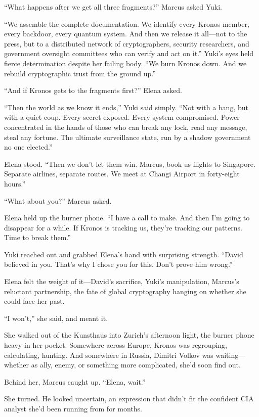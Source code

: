 \documentclass[12pt,letterpaper]{book}
\begin{document}
``What happens after we get all three fragments?'' Marcus asked Yuki.

``We assemble the complete documentation. We identify every Kronos member, every backdoor, every quantum system. And then we release it all---not to the press, but to a distributed network of cryptographers, security researchers, and government oversight committees who can verify and act on it.'' Yuki's eyes held fierce determination despite her failing body. ``We burn Kronos down. And we rebuild cryptographic trust from the ground up.''

``And if Kronos gets to the fragments first?'' Elena asked.

``Then the world as we know it ends,'' Yuki said simply. ``Not with a bang, but with a quiet coup. Every secret exposed. Every system compromised. Power concentrated in the hands of those who can break any lock, read any message, steal any fortune. The ultimate surveillance state, run by a shadow government no one elected.''

Elena stood. ``Then we don't let them win. Marcus, book us flights to Singapore. Separate airlines, separate routes. We meet at Changi Airport in forty-eight hours.''

``What about you?'' Marcus asked.

Elena held up the burner phone. ``I have a call to make. And then I'm going to disappear for a while. If Kronos is tracking us, they're tracking our patterns. Time to break them.''

Yuki reached out and grabbed Elena's hand with surprising strength. ``David believed in you. That's why I chose you for this. Don't prove him wrong.''

Elena felt the weight of it---David's sacrifice, Yuki's manipulation, Marcus's reluctant partnership, the fate of global cryptography hanging on whether she could face her past.

``I won't,'' she said, and meant it.

She walked out of the Kunsthaus into Zurich's afternoon light, the burner phone heavy in her pocket. Somewhere across Europe, Kronos was regrouping, calculating, hunting. And somewhere in Russia, Dimitri Volkov was waiting---whether as ally, enemy, or something more complicated, she'd soon find out.

Behind her, Marcus caught up. ``Elena, wait.''

She turned. He looked uncertain, an expression that didn't fit the confident CIA analyst she'd been running from for months.
\end{document}
